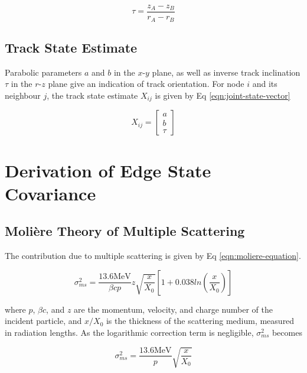 \begin{equation}
\tau = \frac{z_A - z_B}{r_A - r_B}
\label{eqn:tau-parameter}
\end{equation}

\subsection{Track State Estimate}

Parabolic parameters $a$ and $b$ in the $x$-$y$ plane, as well as inverse track inclination $\tau$ in the $r$-$z$ plane give an indication of track orientation. For node $i$ and its neighbour $j$, the track state estimate $X_{ij}$ is given by Eq \eqref{eqn:joint-state-vector}

\begin{equation}
X_{ij} = \begin{bmatrix} a \\ b \\ \tau \end{bmatrix}
\label{eqn:joint-state-vector}
\end{equation}






\section{Derivation of Edge State Covariance}

\subsection{Moli\`ere Theory of Multiple Scattering}

The contribution due to multiple scattering is given by Eq \eqref{eqn:moliere-equation}.

\begin{equation}
    \sigma_{ms}^{2} = \frac{13.6 \text{MeV}}{\beta c p} z \sqrt{\frac{x}{X_0}} \left[ 1 + 0.038ln \left( \frac{x}{X_0} \right) \right] 
    \label{eqn:moliere-equation}
\end{equation}

where $p$, $\beta c$, and $z$ are the momentum, velocity, and charge number of the incident particle, and $x/X_0$ is the thickness of the scattering medium, measured in radiation lengths. As the logarithmic correction term is negligible, $\sigma_{ms}^{2}$ becomes

\begin{equation}
    \sigma_{ms}^{2} = \frac{13.6 \text{MeV}}{p} \sqrt{\frac{x}{X_0}}
    \label{eqn:simplified-moliere-equation}
\end{equation}

